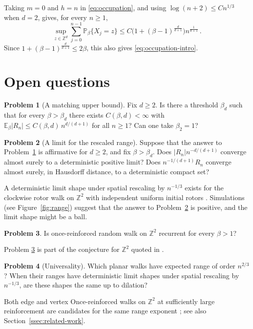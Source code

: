 \documentclass[11pt]{amsart}
\theoremstyle{plain}
\theoremstyle{definition}
\newtheorem{problem}{Problem}
\newcommand{\Z}{\mathbb Z}
\renewcommand{\P}{\mathbb P}
\newcommand{\E}{\mathbb E}
\begin{document}
	Taking $m=0$ and $h=n$ in \eqref{eq:occupation}, and using
	$\log(n+2)\leq Cn^{1/3}$ when $d=2$, gives, for every $n\geq1$,
	\begin{equation}\label{eq:cesaro}
		\sup_{z\in\Z^d}\sum_{j=0}^{n-1}\P_\beta\{X_j=z\}
		\leq C\bigl(1+(\beta-1)^{\frac{d}{d+1}}\bigr)n^{\frac{1}{d+1}}\, .
	\end{equation}
	Since $1+(\beta-1)^{\frac{d}{d+1}}\leq2\beta$, this also gives
	\eqref{eq:occupation-intro}.


	\section{Open questions}\label{sec:questions}
	


\begin{problem}[A matching upper bound]\label{prob:upper}
		Fix $d\geq2$. Is there a threshold $\beta_d$ such that for every $\beta>\beta_d$ there exists $C(\beta,d)<\infty $ with  $\E_\beta|R_n|\leq
		C(\beta,d) \, n^{d/(d+1)}$ for all  $n\geq1$?  Can one take $\beta_2=1$?
	\end{problem}
	
	\begin{problem}[A limit for the rescaled range]\label{prob:limit}
    Suppose that the answer to Problem~\ref{prob:upper} is affirmative for
		$d\geq2$, and fix $\beta>\beta_d$. Does $|R_n|n^{-d/(d+1)}$ converge
		almost surely to a deterministic positive limit? Does
		$n^{-1/(d+1)}R_n$ converge almost surely, in Hausdorff distance, to a
		deterministic compact set? 
	\end{problem}
    
    
    A deterministic limit shape under spatial rescaling by $n^{-1/3}$ exists
	for the clockwise rotor walk on $\Z^2$ with independent uniform initial rotors \citep[Theorem~1.1]{BouRabeePeres2026}.
Simulations (see Figure~\ref{fig:range}) suggest that the answer to Problem~\ref{prob:limit} is positive, and the limit shape might be a ball. 

	
	
	
	\begin{problem} \label{prob:recurrence}
		Is once-reinforced random walk on $\Z^2$ recurrent for every $\beta>1$?  
	\end{problem}
    Problem \ref{prob:recurrence} is part of the conjecture for $\Z^2$ quoted in
		\citet[Section~1]{CollevecchioTarres2025}.


	\begin{problem}[Universality]\label{prob:universality}
		Which planar walks have expected range of order $n^{2/3}$?
		When their ranges have deterministic limit shapes under spatial
		rescaling by $n^{-1/3}$, are these shapes the same up to dilation?
	\end{problem}

	Both edge and vertex Once-reinforced walks on $\Z^2$ at sufficiently
	large reinforcement are candidates for the same range exponent
	\citep[Section~I]{FosterGrassbergerPaczuski2009}; see also
	Section~\ref{ssec:related-work}. 




	
	
\end{document}

